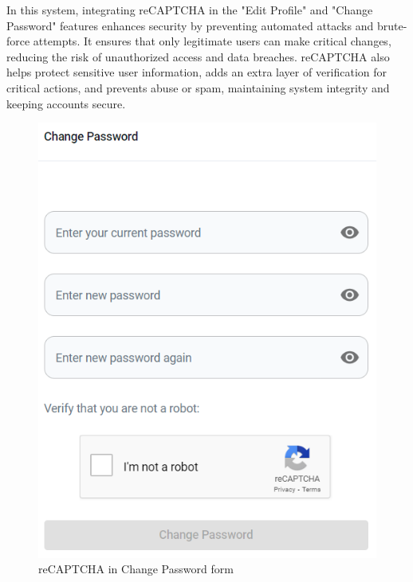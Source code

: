 	In this system, integrating reCAPTCHA in the "Edit Profile" and "Change Password" features enhances security by preventing automated attacks and brute-force attempts. It ensures that only legitimate users can make critical changes, reducing the risk of unauthorized access and data breaches. reCAPTCHA also helps protect sensitive user information, adds an extra layer of verification for critical actions, and prevents abuse or spam, maintaining system integrity and keeping accounts secure.
	\begin{figure}[H]
		\centering
		\includegraphics[width=0.3\linewidth]{graphics/change-password-captcha}
		\caption{reCAPTCHA in Change Password form}
		\label{fig:change-password-captcha}
	\end{figure}
	
	
	
	
	
	